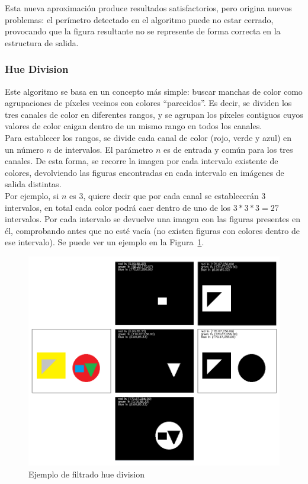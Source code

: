 {	Esta nueva aproximación produce resultados satisfactorios, pero origina nuevos problemas: el perímetro detectado en el algoritmo puede no estar cerrado, provocando que la figura resultante no se represente de forma correcta en la estructura de salida.
	
	\subsubsection{Hue Division}
	
	Este algoritmo se basa en un concepto más simple: buscar manchas de color como agrupaciones de píxeles vecinos con colores ``parecidos''. Es decir, se dividen los tres canales de color en diferentes rangos, y se agrupan los píxeles contiguos cuyos valores de color caigan dentro de un mismo rango en todos los canales.\\
	
	Para establecer los rangos, se divide cada canal de color (rojo, verde y azul) en un número $n$ de intervalos. El parámetro $n$ es de entrada y común para los tres canales. De esta forma, se recorre la imagen por cada intervalo existente de colores, devolviendo las figuras encontradas en cada intervalo en imágenes de salida distintas.\\
	
	Por ejemplo, si $n$ es 3, quiere decir que por cada canal se establecerán 3 intervalos, en total cada color podrá caer dentro de uno de los $3*3*3=27$ intervalos. Por cada intervalo se devuelve una imagen con las figuras presentes en él, comprobando antes que no esté vacía (no existen figuras con colores dentro de ese intervalo). Se puede ver un ejemplo en la Figura~\ref{fig:huedivision}.
	
		\begin{figure}[!htbp]
		\centering
		\includegraphics[scale=0.47]{graphics/huedivision.png}
		\caption{Ejemplo de filtrado hue division}
		\label{fig:huedivision}
		\end{figure}
	
}
